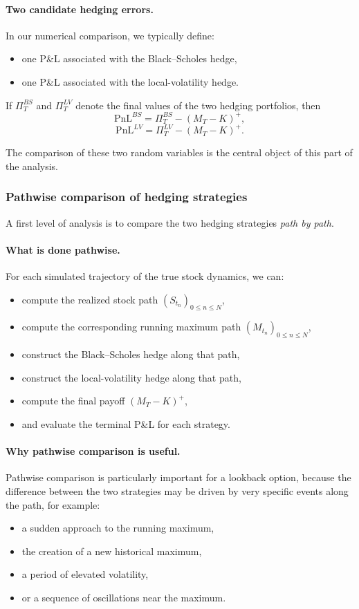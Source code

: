 \documentclass[11pt]{article}
\theoremstyle{plain}
\theoremstyle{definition}
\theoremstyle{remark}
\begin{document}
\paragraph{Two candidate hedging errors.}
In our numerical comparison, we typically define:
\begin{itemize}[leftmargin=1.4em]
    \item one P\&L associated with the Black--Scholes hedge,
    \item one P\&L associated with the local-volatility hedge.
\end{itemize}

If \(\Pi_T^{BS}\) and \(\Pi_T^{LV}\) denote the final values of the two
hedging portfolios, then
\[
\mathrm{PnL}^{BS}
=
\Pi_T^{BS}-(M_T-K)^+,
\]
\[
\mathrm{PnL}^{LV}
=
\Pi_T^{LV}-(M_T-K)^+.
\]

The comparison of these two random variables is the central object of
this part of the analysis.

\subsubsection{Pathwise comparison of hedging strategies}

A first level of analysis is to compare the two hedging strategies
\emph{path by path}.

\paragraph{What is done pathwise.}
For each simulated trajectory of the true stock dynamics, we can:
\begin{itemize}[leftmargin=1.4em]
    \item compute the realized stock path \((S_{t_n})_{0\le n\le N}\),
    \item compute the corresponding running maximum path
    \((M_{t_n})_{0\le n\le N}\),
    \item construct the Black--Scholes hedge along that path,
    \item construct the local-volatility hedge along that path,
    \item compute the final payoff \((M_T-K)^+\),
    \item and evaluate the terminal P\&L for each strategy.
\end{itemize}

\paragraph{Why pathwise comparison is useful.}
Pathwise comparison is particularly important for a lookback option,
because the difference between the two strategies may be driven by very
specific events along the path, for example:
\begin{itemize}[leftmargin=1.4em]
    \item a sudden approach to the running maximum,
    \item the creation of a new historical maximum,
    \item a period of elevated volatility,
    \item or a sequence of oscillations near the maximum.
\end{itemize}
\end{document}
